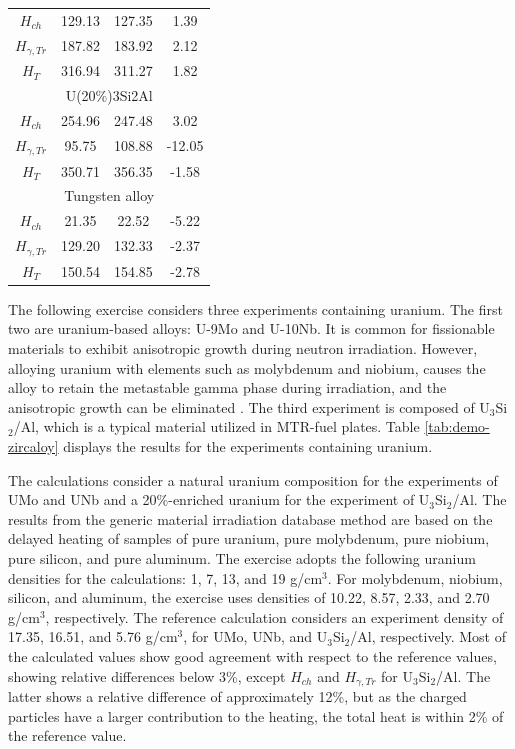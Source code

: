 \begin{table}[htbp!]
\begin{tabular}{cccc}
    $H_{ch}$            & 129.13   & 127.35  &  1.39  \\
    $H_{\gamma, Tr}$    & 187.82   & 183.92  &  2.12  \\
    $H_{T}$             & 316.94   & 311.27  &  1.82  \\
    \midrule
    \multicolumn{4}{c}{U(20\%)3Si2Al}                 \\
    \midrule
    $H_{ch}$            & 254.96   & 247.48  &  3.02  \\
    $H_{\gamma, Tr}$    &  95.75   & 108.88  &-12.05  \\
    $H_{T}$             & 350.71   & 356.35  & -1.58  \\
    \midrule
    \multicolumn{4}{c}{Tungsten alloy}    \\
    \midrule
    $H_{ch}$            &  21.35   &  22.52  & -5.22  \\
    $H_{\gamma, Tr}$    & 129.20   & 132.33  & -2.37  \\
    $H_{T}$             & 150.54   & 154.85  & -2.78  \\
    \bottomrule
  \end{tabular}
\end{table}

The following exercise considers three experiments containing uranium.
The first two are uranium-based alloys: U-9Mo and U-10Nb.
It is common for fissionable materials to exhibit anisotropic growth during neutron irradiation.
However, alloying uranium with elements such as molybdenum and niobium, causes the alloy to retain the metastable gamma phase during irradiation, and the anisotropic growth can be eliminated \cite{bleiberg_2004}.
The third experiment is composed of U$_3$Si$_2$/Al, which is a typical material utilized in \gls*{MTR}-fuel plates.
% 
Table \ref{tab:demo-zircaloy} displays the results for the experiments containing uranium.

The calculations consider a natural uranium composition for the experiments of UMo and UNb and a 20\%-enriched uranium for the experiment of U$_3$Si$_2$/Al.
The results from the generic material irradiation database method are based on the delayed heating of samples of pure uranium, pure molybdenum, pure niobium, pure silicon, and pure aluminum.
The exercise adopts the following uranium densities for the calculations: 1, 7, 13, and 19 g/cm$^3$.
For molybdenum, niobium, silicon, and aluminum, the exercise uses densities of 10.22, 8.57, 2.33, and 2.70 g/cm$^3$, respectively.
The reference calculation considers an experiment density of 17.35, 16.51, and 5.76 g/cm$^3$, for UMo, UNb, and U$_3$Si$_2$/Al, respectively.
Most of the calculated values show good agreement with respect to the reference values, showing relative differences below 3\%, except $H_{ch}$ and $H_{\gamma, Tr}$ for U$_3$Si$_2$/Al.
The latter shows a relative difference of approximately 12\%, but as the charged particles have a larger contribution to the heating, the total heat is within 2\% of the reference value.

